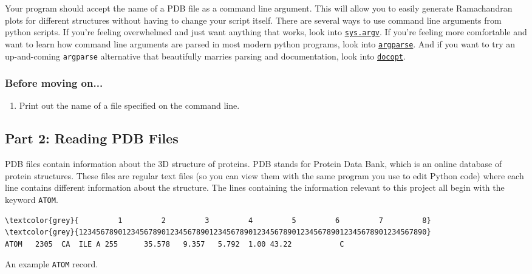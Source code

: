 \documentclass{article}
\newcommand{\module}[2]{\href{#2}{\texttt{#1}}}
\newcommand{\atomrec}{\texttt{ATOM} record}
\newenvironment{problems}
{\subsubsection{Before moving on...} \begin{enumerate}}
{\end{enumerate}}
\begin{document}
Your program should accept the name of a PDB file as a command line argument.  
This will allow you to easily generate Ramachandran plots for different 
structures without having to change your script itself.  There are several ways 
to use command line arguments from python scripts.  If you're feeling 
overwhelmed and just want anything that works, look into 
\module{sys.argv}{http://learnpythonthehardway.org/book/ex13.html}.  If you're 
feeling more comfortable and want to learn how command line arguments are 
parsed in most modern python programs, look into 
\module{argparse}{https://docs.python.org/2.7/howto/argparse.html}.  And if you 
want to try an up-and-coming \texttt{argparse} alternative that beautifully 
marries parsing and documentation, look into 
\module{docopt}{https://github.com/docopt/docopt}.

\begin{problems}
\item Print out the name of a file specified on the command line.
\end{problems}

\subsection{Part 2: Reading PDB Files}

PDB files contain information about the 3D structure of proteins.  PDB stands 
for Protein Data Bank, which is an online database of protein structures.  
These  files are regular text files (so you can view them with the same program 
you use to edit Python code) where each line contains different information 
about the structure.  The lines containing the information relevant to this 
project all begin with the keyword \texttt{ATOM}.  

\begin{listing}[h]
\centering
\begin{BVerbatim}[fontsize=\footnotesize,commandchars=\\\{\}]
\textcolor{grey}{         1         2         3         4         5         6         7         8}
\textcolor{grey}{12345678901234567890123456789012345678901234567890123456789012345678901234567890}
ATOM   2305  CA  ILE A 255      35.578   9.357   5.792  1.00 43.22           C  
\end{BVerbatim}
\caption{An example \atomrec{}.}
\label{list:pdb-example}
\end{listing}
\end{document}
